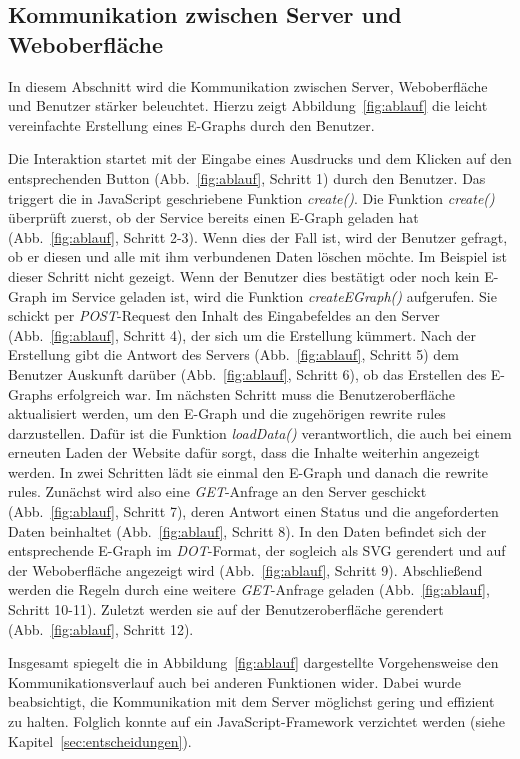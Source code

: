\subsection{Kommunikation zwischen Server und Weboberfläche}

In diesem Abschnitt wird die Kommunikation zwischen Server, Weboberfläche und Benutzer stärker beleuchtet.
Hierzu zeigt Abbildung~\ref{fig:ablauf} die leicht vereinfachte Erstellung eines E-Graphs durch den Benutzer.

Die Interaktion startet mit der Eingabe eines Ausdrucks und dem Klicken auf den entsprechenden Button (Abb.~\ref{fig:ablauf}, Schritt 1) durch den Benutzer.
Das triggert die in JavaScript geschriebene Funktion \textit{create()}. 
Die Funktion \textit{create()} überprüft zuerst, ob der Service bereits einen E-Graph geladen hat (Abb.~\ref{fig:ablauf}, Schritt 2-3). Wenn dies der Fall ist, wird der Benutzer
gefragt, ob er diesen und alle mit ihm verbundenen Daten löschen möchte. Im Beispiel ist dieser Schritt nicht gezeigt.
Wenn der Benutzer dies bestätigt oder noch kein E-Graph im Service geladen ist, wird die Funktion \textit{createEGraph()} aufgerufen. 
Sie schickt per \textit{POST}-Request den Inhalt des Eingabefeldes an den Server (Abb.~\ref{fig:ablauf}, Schritt 4), der sich um die Erstellung kümmert.
Nach der Erstellung gibt die Antwort des Servers (Abb.~\ref{fig:ablauf}, Schritt 5) dem Benutzer Auskunft darüber (Abb.~\ref{fig:ablauf}, Schritt 6), ob das Erstellen des E-Graphs erfolgreich war.
Im nächsten Schritt muss die Benutzeroberfläche aktualisiert werden, um den E-Graph und die zugehörigen rewrite rules darzustellen.
Dafür ist die Funktion \textit{loadData()} verantwortlich, die auch bei einem erneuten Laden der Website dafür sorgt, dass die Inhalte weiterhin angezeigt werden.
In zwei Schritten lädt sie einmal den E-Graph und danach die rewrite rules.
Zunächst wird also eine \textit{GET}-Anfrage an den Server geschickt (Abb.~\ref{fig:ablauf}, Schritt 7), deren Antwort einen Status und die angeforderten Daten beinhaltet (Abb.~\ref{fig:ablauf}, Schritt 8).
In den Daten befindet sich der entsprechende E-Graph im \textit{DOT}-Format, der sogleich als SVG gerendert und auf 
der Weboberfläche angezeigt wird (Abb.~\ref{fig:ablauf}, Schritt 9).
Abschließend werden die Regeln durch eine weitere \textit{GET}-Anfrage geladen (Abb.~\ref{fig:ablauf}, Schritt 10-11). Zuletzt werden sie auf der Benutzeroberfläche gerendert (Abb.~\ref{fig:ablauf}, Schritt 12).

Insgesamt spiegelt die in Abbildung~\ref{fig:ablauf} dargestellte Vorgehensweise den Kommunikationsverlauf auch bei anderen Funktionen wider.
Dabei wurde beabsichtigt, die Kommunikation mit dem Server möglichst gering und effizient zu halten. Folglich konnte auf ein JavaScript-Framework verzichtet werden (siehe Kapitel~\ref{sec:entscheidungen}).

